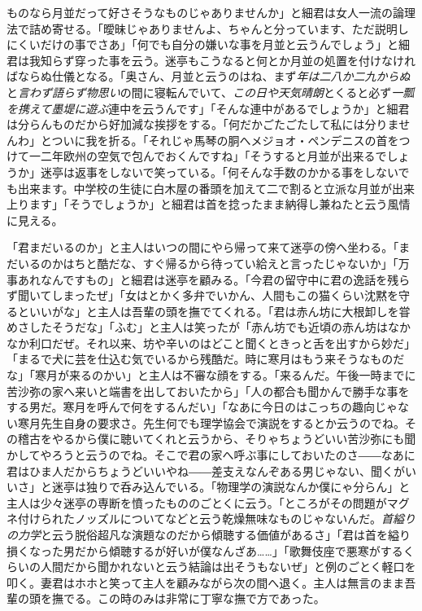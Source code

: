 \documentclass[12pt, openright]{book}
\begin{document}
ものなら月並だって好さそうなものじゃありませんか」と細君は女人一流の論理法で詰め寄せる。「曖昧じゃありませんよ、ちゃんと分っています、ただ説明しにくいだけの事でさあ」「何でも自分の嫌いな事を月並と云うんでしょう」と細君は我知らず穿った事を云う。迷亭もこうなると何とか月並の処置を付けなければならぬ仕儀となる。「奥さん、月並と云うのはね、まず\emph{年は二八か二九からぬ}と\emph{言わず語らず物思い}の間に寝転んでいて、\emph{この日や天気晴朗}とくると必ず\emph{一瓢を携えて墨堤に遊ぶ}連中を云うんです」「そんな連中があるでしょうか」と細君は分らんものだから好加減な挨拶をする。「何だかごたごたして私には分りませんわ」とついに我を折る。「それじゃ馬琴の胴へメジョオ・ペンデニスの首をつけて一二年欧州の空気で包んでおくんですね」「そうすると月並が出来るでしょうか」迷亭は返事をしないで笑っている。「何そんな手数のかかる事をしないでも出来ます。中学校の生徒に白木屋の番頭を加えて二で割ると立派な月並が出来上ります」「そうでしょうか」と細君は首を捻ったまま納得し兼ねたと云う風情に見える。

「君まだいるのか」と主人はいつの間にやら帰って来て迷亭の傍へ坐わる。「まだいるのかはちと酷だな、すぐ帰るから待ってい給えと言ったじゃないか」「万事あれなんですもの」と細君は迷亭を顧みる。「今君の留守中に君の逸話を残らず聞いてしまったぜ」「女はとかく多弁でいかん、人間もこの猫くらい沈黙を守るといいがな」と主人は吾輩の頭を撫でてくれる。「君は赤ん坊に大根卸しを甞めさしたそうだな」「ふむ」と主人は笑ったが「赤ん坊でも近頃の赤ん坊はなかなか利口だぜ。それ以来、坊や辛いのはどこと聞くときっと舌を出すから妙だ」「まるで犬に芸を仕込む気でいるから残酷だ。時に寒月はもう来そうなものだな」「寒月が来るのかい」と主人は不審な顔をする。「来るんだ。午後一時までに苦沙弥の家へ来いと端書を出しておいたから」「人の都合も聞かんで勝手な事をする男だ。寒月を呼んで何をするんだい」「なあに今日のはこっちの趣向じゃない寒月先生自身の要求さ。先生何でも理学協会で演説をするとか云うのでね。その稽古をやるから僕に聴いてくれと云うから、そりゃちょうどいい苦沙弥にも聞かしてやろうと云うのでね。そこで君の家へ呼ぶ事にしておいたのさ――なあに君はひま人だからちょうどいいやね――差支えなんぞある男じゃない、聞くがいいさ」と迷亭は独りで呑み込んでいる。「物理学の演説なんか僕にゃ分らん」と主人は少々迷亭の専断を憤ったもののごとくに云う。「ところがその問題がマグネ付けられたノッズルについてなどと云う乾燥無味なものじゃないんだ。\emph{首縊りの力学}と云う脱俗超凡な演題なのだから傾聴する価値があるさ」「君は首を縊り損くなった男だから傾聴するが好いが僕なんざあ\ldots{}\ldots{}」「歌舞伎座で悪寒がするくらいの人間だから聞かれないと云う結論は出そうもないぜ」と例のごとく軽口を叩く。妻君はホホと笑って主人を顧みながら次の間へ退く。主人は無言のまま吾輩の頭を撫でる。この時のみは非常に丁寧な撫で方であった。
\end{document}
